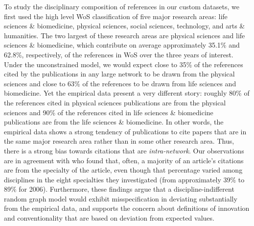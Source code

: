 \documentclass[NETN]{stjour}
\begin{document}
To study the disciplinary composition of references in our custom datasets, we first used the high level WoS classification of five major research areas: life sciences \& biomedicine, physical sciences, social sciences, technology, and arts \& humanities. The two largest of these research areas are physical sciences and life sciences \& biomedicine, which contribute on average approximately 35.1\% and 62.8\%, respectively, of the references in WoS over the three years of interest. Under the unconstrained model, we would expect close to 35\% of the references cited by the publications in any large network  to be drawn from the physical sciences and close to 63\% of the references to be drawn from  life sciences and biomedicine. Yet the empirical data present a very different  story: roughly 80\% of the references cited in physical sciences publications are from the physical sciences and 90\% of the references cited in life sciences \& biomedicine publications are from the life sciences \& biomedicine. In other words, the empirical data shows a strong tendency of publications to cite papers that are in the same major research area rather than in some other research area.  Thus, there is a strong bias towards citations that are {\em intra-network}. Our observations are in agreement with \cite{wallace_lariviere_gingras_2012} who found that, often, a majority of an article's citations are from the specialty of the article, even though that percentage varied among disciplines in the eight specialties they investigated (from approximately 39\% to 89\% for 2006). Furthermore, these findings argue that a discipline-indifferent random graph model would exhibit misspecification in deviating substantially from the empirical data, and supports the  concern about definitions of  innovation and conventionality that are based on deviation from expected values. 
\end{document}
